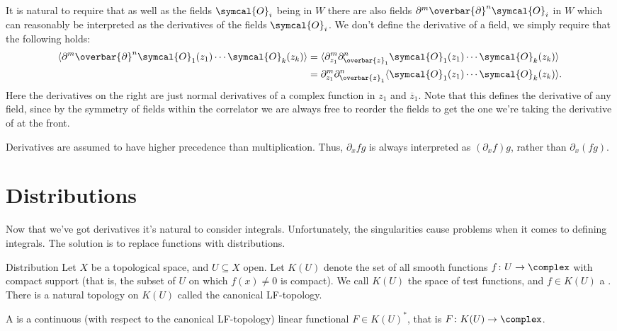 \documentclass[fleqn]{NotesClass}
\newcommand{\quantumField}[1]{\symcal{#1}}
\DeclarePairedDelimiter{\correlator}{\langle}{\rangle}
\begin{document}
    It is natural to require that as well as the fields \(\quantumField{O}_i\) being in \(W\) there are also fields \(\partial^m\overbar{\partial}^n\quantumField{O}_i\) in \(W\) which can reasonably be interpreted as the derivatives of the fields \(\quantumField{O}_i\).
    We don't define the derivative of a field, we simply require that the following holds:
    \begin{align}
        \correlator{\partial^m \overbar{\partial}^n \quantumField{O}_1(z_1) \dotsm \quantumField{O}_k(z_k)} &= \correlator{\partial_{z_1}^m \partial_{\overbar{z}_1}^n \quantumField{O}_1(z_1) \dotsm \quantumField{O}_k(z_k)}\\
        &= \partial_{z_1}^m \partial_{\overbar{z}_1}^n \correlator{\quantumField{O}_1(z_1) \dotsm \quantumField{O}_k(z_k)}.
    \end{align}
    Here the derivatives on the right are just normal derivatives of a complex function in \(z_1\) and \(\overbar{z}_1\).
    Note that this defines the derivative of any field, since by the symmetry of fields within the correlator we are always free to reorder the fields to get the one we're taking the derivative of at the front.
    
    \begin{ntn}{}{}
        Derivatives are assumed to have higher precedence than multiplication.
        Thus, \(\partial_xfg\) is always interpreted as \((\partial_xf)g\), rather than \(\partial_x(fg)\).
    \end{ntn}
    
    \section{Distributions}
    Now that we've got derivatives it's natural to consider integrals.
    Unfortunately, the singularities cause problems when it comes to defining integrals.
    The solution is to replace functions with distributions.
    
    \begin{dfn}{Distribution}{}
        Let \(X\) be a topological space, and \(U \subseteq X\) open.
        Let \(K(U)\) denote the set of all smooth functions \(f \colon U \to \complex\) with compact support (that is, the subset of \(U\) on which \(f(x) \ne 0\) is compact).
        We call \(K(U)\) the space of test functions, and \(f \in K(U)\) a .
        There is a natural topology on \(K(U)\) called the canonical LF-topology.
        
        A  is a continuous (with respect to the canonical LF-topology) linear functional \(F \in K(U)^*\), that is \(F \colon K(U) \to \complex\).
    \end{dfn}
    
\end{document}
